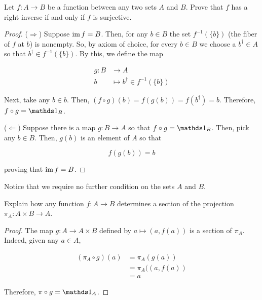\documentclass{article}
\begin{document}
\begin{ex}\cite[Prop-2.1.2]{aluffi_algebra_2009}
	Let \(f:A\to B\) be a function between any two sets \(A\) and \(B\).
	Prove that \(f\) has a right inverse if and only if \(f\) is surjective.
\end{ex}
\begin{proof}
  (\(\Longrightarrow\)) Suppose \(\operatorname{im} f = B\). Then, for any \(b \in B\) 
  the set \(f^{-1}\left(\{b\}\right)\) (the fiber of \(f\) at \(b\)) is nonempty. 
  So, by axiom of choice, for every \(b \in B\) we choose a \(b^{\dagger}\in A\) so that 
  \(b^{\dagger} \in f^{-1}\left(\{b\}\right)\). By this, we define the map

  \begin{align*}
    g \colon B &\longrightarrow A \\
    b &\longmapsto b^{\dagger} \in f^{-1}(\{b\})
  \end{align*}

  Next, take any \(b \in b\). Then, \((f\circ g)(b) = f(g(b)) = f(b^{\dagger}) = b\). Therefore, 
  \(f \circ g = \one_{B}\).

  (\(\Longleftarrow\))
  Suppose there is a map \(g: B \to A\) so that \(f \circ g = \one_{B}\).
  Then, pick any \(b \in B\). Then, \(g(b)\) is an element of \(A\) so that 

  \begin{equation}
    f(g(b)) = b
  \end{equation}

  proving that \(\operatorname{im} f = B\).

\end{proof}
\begin{remark}
  Notice that we require no further condition on the sets \(A\) and \(B\). 
\end{remark}

\begin{ex}\cite[Ex-2.6]{aluffi_algebra_2009}
  Explain how any function \(f: A \rightarrow B\) determines a section of the projection 
  \(\pi_{A}: A\times B \to A\).
\end{ex}
\begin{proof}

  The map \(g : A \to A \times B\) defined by \(a \mapsto (a, f(a))\)
  is a section of \(\pi_{A}\). Indeed, given any \(a\in A\), 

  \begin{align*}
    (\pi_{A}\circ g)(a) &= \pi_{A}(g(a))\\
                        &= \pi_{A}((a,f(a)) \\
                        &= a
  \end{align*}
  
  Therefore, \(\pi\circ g = \one_{A}\).

\end{proof}
\end{document}
